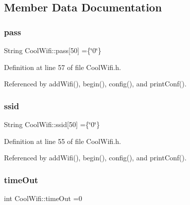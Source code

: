 \subsection{Member Data Documentation}
\mbox{\label{classCoolWifi_a0c3332a149245aaad060b32593a54c9b}} 
\subsubsection{\texorpdfstring{pass}{pass}}
{\footnotesize\ttfamily String Cool\+Wifi\+::pass\mbox{[}50\mbox{]} =\{\char`\"{}0\char`\"{}\}\hspace{0.3cm}{\ttfamily [private]}}



Definition at line 57 of file Cool\+Wifi.\+h.



Referenced by add\+Wifi(), begin(), config(), and print\+Conf().

\mbox{\label{classCoolWifi_a893b21d0fed821438733bba2e73fb4c2}} 
\subsubsection{\texorpdfstring{ssid}{ssid}}
{\footnotesize\ttfamily String Cool\+Wifi\+::ssid\mbox{[}50\mbox{]} =\{\char`\"{}0\char`\"{}\}\hspace{0.3cm}{\ttfamily [private]}}



Definition at line 55 of file Cool\+Wifi.\+h.



Referenced by add\+Wifi(), begin(), config(), and print\+Conf().

\mbox{\label{classCoolWifi_a952111605f25156588b5632caaba1c6f}} 
\subsubsection{\texorpdfstring{time\+Out}{timeOut}}
{\footnotesize\ttfamily int Cool\+Wifi\+::time\+Out =0\hspace{0.3cm}{\ttfamily [private]}}



